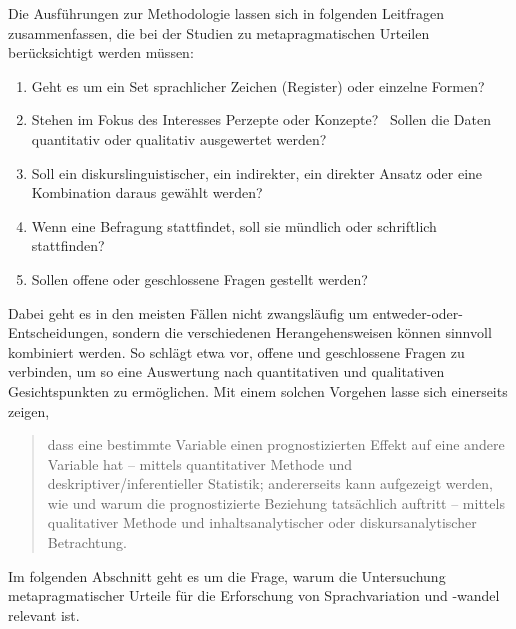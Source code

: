 Die Ausführungen zur Methodologie lassen sich in folgenden Leitfragen zusammenfassen, die bei der Studien zu metapragmatischen Urteilen berücksichtigt werden müssen:
\begin{enumerate}
\item Geht es um ein Set sprachlicher Zeichen (Register) oder einzelne Formen?
\item Stehen im Fokus des Interesses Perzepte oder Konzepte? 
\ Sollen die Daten quantitativ oder qualitativ ausgewertet werden? 
\item Soll ein diskurslinguistischer, ein indirekter, ein direkter Ansatz oder eine Kombination daraus gewählt werden? 
\item Wenn eine Befragung stattfindet, soll sie mündlich oder schriftlich stattfinden? 
\item Sollen offene oder geschlossene Fragen gestellt werden? 
\end{enumerate} 
Dabei geht es in den meisten Fällen nicht zwangsläufig um entweder-oder-Entscheidungen, sondern die verschiedenen Herangehensweisen können sinnvoll kombiniert werden. 
So schlägt etwa \citet[179]{Studler.2014} vor, offene und geschlossene Fragen zu verbinden, um so eine Auswertung nach quantitativen und qualitativen Gesichtspunkten zu ermöglichen. 
Mit einem solchen Vorgehen lasse sich einerseits zeigen, 
\begin{quote}dass eine bestimmte Variable einen prognostizierten Effekt auf eine andere Variable hat -- mittels quantitativer Methode und deskriptiver/inferentieller Statistik; andererseits kann aufgezeigt werden, wie und warum die prognostizierte Beziehung tatsächlich auftritt -- mittels qualitativer Methode und inhaltsanalytischer oder diskursanalytischer Betrachtung. \citep[179]{Studler.2014}\end{quote}
Im folgenden Abschnitt geht es um die Frage, warum die Untersuchung metapragmatischer Urteile für die Erforschung von Sprachvariation und -wandel relevant ist. 
